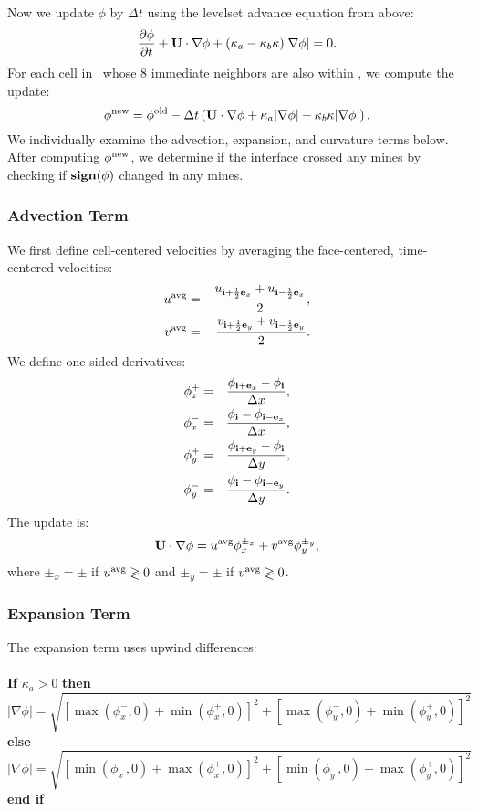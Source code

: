 \subsection{\PHIUPD}\label{Sec:PHIUPD}
Now we update $\phi$ by $\Delta t$ using the levelset advance equation from above:
\begin{equation}
\frac{\partial\phi}{\partial t} + {\bf U}\cdot\nabla\phi + (\kappa_a-\kappa_b\kappa)|\nabla\phi| = 0.
\end{equation}
For each cell in \nband~whose 8 immediate neighbors are also within \nband, we compute the update:
\begin{equation}
\phi^{\rm new} = \phi^{\rm old} - \Delta t\left({\bf U}\cdot\nabla\phi + \kappa_a|\nabla\phi| - \kappa_b\kappa|\nabla\phi|\right).
\end{equation}
We individually examine the advection, expansion, and curvature terms below.  After computing $\phi^{\rm new}$, we determine if the interface crossed any mines by checking if ${\tt{\bf sign}}(\phi)$ changed in any mines.
\subsubsection{Advection Term}
We first define cell-centered velocities by averaging the face-centered, time-centered velocities:
\begin{eqnarray}
u^{\rm avg} &=& \frac{u_{{\bf i}+\frac{1}{2}{\bf e}_x} + u_{{\bf i}-\frac{1}{2}{\bf e}_x}}{2}, \\
v^{\rm avg} &=& \frac{v_{{\bf i}+\frac{1}{2}{\bf e}_y} + v_{{\bf i}-\frac{1}{2}{\bf e}_y}}{2}.
\end{eqnarray}
We define one-sided derivatives:
\begin{eqnarray}
\phi_x^+ &=& \frac{\phi_{{\bf i}+{\bf e}_x}-\phi_{{\bf i}}}{\Delta x}, \\
\phi_x^- &=& \frac{\phi_{{\bf i}}-\phi_{{\bf i}-{\bf e}_x}}{\Delta x}, \\
\phi_y^+ &=& \frac{\phi_{{\bf i}+{\bf e}_y}-\phi_{{\bf i}}}{\Delta y}, \\
\phi_y^- &=& \frac{\phi_{{\bf i}}-\phi_{{\bf i}-{\bf e}_y}}{\Delta y}.
\end{eqnarray}
The update is:
\begin{equation}
{\bf U}\cdot\nabla\phi = u^{\rm avg}\phi_x^{\pm_x} + v^{\rm avg}\phi_y^{\pm_y},
\end{equation}
where $\pm_x = \pm$ if $u^{\rm avg} \gtrless 0$ and $\pm_y = \pm$ if $v^{\rm avg} \gtrless 0$.
\subsubsection{Expansion Term}
The expansion term uses upwind differences:\\ \\
{\bf If} $\kappa_a > 0$ {\bf then}
\begin{equation}
|\nabla\phi| = \sqrt{\left[\max(\phi_x^-,0) + \min(\phi_x^+,0)\right]^2 + \left[\max(\phi_y^-,0) + \min(\phi_y^+,0)\right]^2}
\end{equation}
{\bf else}
\begin{equation}
|\nabla\phi| = \sqrt{\left[\min(\phi_x^-,0) + \max(\phi_x^+,0)\right]^2 + \left[\min(\phi_y^-,0) + \max(\phi_y^+,0)\right]^2}
\end{equation}
{\bf end if}
